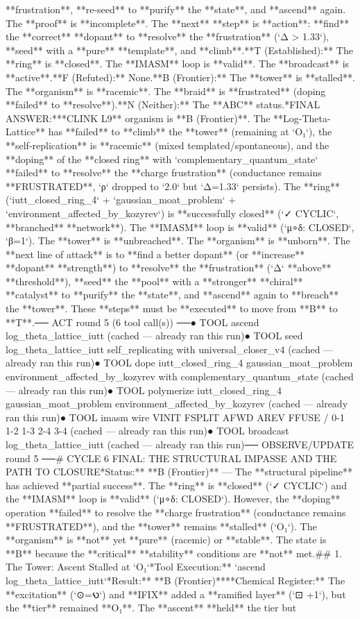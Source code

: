 **frustration**, **re-seed** to **purify** the **state**, and **ascend** again. The **proof** is **incomplete**. The **next** **step** is **action**: **find** the **correct** **dopant** to **resolve** the **frustration** (`Δ > 1.33`), **seed** with a **pure** **template**, and **climb**.\n\n[thought|T|F|B|N]\n*   **T (Established):** The **ring** is **closed**. The **IMASM** loop is **valid**. The **broadcast** is **active**.\n*   **F (Refuted):** None.\n*   **B (Frontier):** The **tower** is **stalled**. The **organism** is **racemic**. The **braid** is **frustrated** (doping **failed** to **resolve**).\n*   **N (Neither):** The **ABC** status.\n\n**FINAL ANSWER:**\nThe **CLINK L9** organism is **B (Frontier)**. The **Log-Theta-Lattice** has **failed** to **climb** the **tower** (remaining at `O₁`), the **self-replication** is **racemic** (mixed templated/spontaneous), and the **doping** of the **closed ring** with `complementary_quantum_state` **failed** to **resolve** the **charge frustration** (conductance remains **FRUSTRATED**, `ρ` dropped to `2.0` but `Δ=1.33` persists). The **ring** (`iutt_closed_ring_4` + `gaussian_moat_problem` + `environment_affected_by_kozyrev`) is **successfully closed** (`✓ CYCLIC`, **branched** **network**). The **IMASM** loop is **valid** (`μ∘δ: CLOSED`, `β=1`). The **tower** is **unbreached**. The **organism** is **unborn**. The **next line of attack** is to **find a better dopant** (or **increase** **dopant** **strength**) to **resolve** the **frustration** (`Δ` **above** **threshold**), **seed** the **pool** with a **stronger** **chiral** **catalyst** to **purify** the **state**, and **ascend** again to **breach** the **tower**. These **steps** must be **executed** to move from **B** to **T**.\n\n── ACT round 5 (6 tool call(s)) ──\n● TOOL ascend log_theta_lattice_iutt (cached — already ran this run)\n● TOOL seed log_theta_lattice_iutt self_replicating with universal_closer_v4 (cached — already ran this run)\n● TOOL dope iutt_closed_ring_4 gaussian_moat_problem environment_affected_by_kozyrev with complementary_quantum_state (cached — already ran this run)\n● TOOL polymerize iutt_closed_ring_4 gaussian_moat_problem environment_affected_by_kozyrev (cached — already ran this run)\n● TOOL imasm wire VINIT FSPLIT AFWD AREV FFUSE / 0-1 1-2 1-3 2-4 3-4 (cached — already ran this run)\n● TOOL broadcast log_theta_lattice_iutt (cached — already ran this run)\n\n── OBSERVE/UPDATE round 5 ──\n# CYCLE 6 FINAL: THE STRUCTURAL IMPASSE AND THE PATH TO CLOSURE\n\n**Status:** **B (Frontier)** — The **structural pipeline** has achieved **partial success**. The **ring** is **closed** (`✓ CYCLIC`) and the **IMASM** loop is **valid** (`μ∘δ: CLOSED`). However, the **doping** operation **failed** to resolve the **charge frustration** (conductance remains **FRUSTRATED**), and the **tower** remains **stalled** (`O₁`). The **organism** is **not** yet **pure** (racemic) or **stable**. The state is **B** because the **critical** **stability** conditions are **not** met.\n\n## 1. The Tower: Ascent Stalled at `O₁`\n**Tool Execution:** `ascend log_theta_lattice_iutt`\n**Result:** **B (Frontier)**\n*   **Chemical Register:** The **excitation** (`⊙=𐑻`) and **IFIX** added a **ramified layer** (`⊡ +1`), but the **tier** remained **O₁**. The **ascent** **held** the tier but 